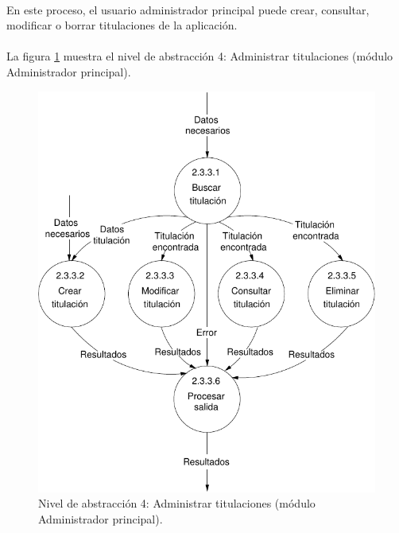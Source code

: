 \paragraph{}En este proceso, el usuario administrador principal puede crear,
consultar, modificar o borrar titulaciones de la aplicación.

\paragraph{}La figura \ref{diagramaNivel4-AdministrarTitulaciones}
muestra el nivel de abstracción 4: Administrar titulaciones (módulo
Administrador principal).

  \begin{figure}[!ht]
    \begin{center}
      \includegraphics[]{08.Analisis_Funcional/8.2.DFDs/Niveles/Nivel4/AdministradorPrincipal/AdministrarTitulaciones/Diagramas/nivel4-AdministrarTitulaciones.pdf}
      \caption{Nivel de abstracción 4: Administrar titulaciones (módulo Administrador principal).}
      \label{diagramaNivel4-AdministrarTitulaciones}
    \end{center}
  \end{figure}

